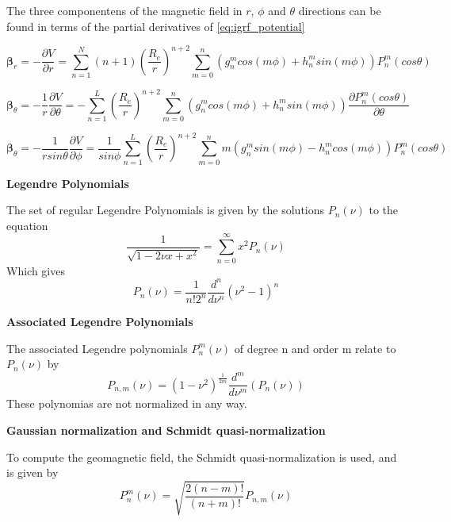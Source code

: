 The three componentens of the magnetic field in $r$, $\phi$ and $\theta$ directions can be found in terms of the partial derivatives of \ref{eq:igrf_potential}

\begin{equation}
{\bm \beta}_r = -\dfrac{\partial V}{\partial r} = \sum_{n=1}^{N} (n+1) \left(\dfrac{R_e}{r}\right)^{n+2} \sum_{m=0}^{n} \left(g_n^m cos(m\phi) + h_n^m sin(m\phi)\right) P_n^m(cos\theta)
\end{equation}

\begin{equation}
{\bm \beta}_{\theta} = -\dfrac{1}{r} \dfrac{\partial V}{\partial \theta} = 
-\sum_{n=1}^{L} \left(\dfrac{R_e}{r}\right)^{n+2} \sum_{m=0}^{n} \left(g_n^m cos(m\phi) + h_n^m sin(m\phi)\right) \dfrac{\partial P_n^m(cos\theta)}{\partial \theta}
\end{equation}

\begin{equation}
{\bm \beta}_{\theta} = -\dfrac{1}{r sin\theta} \dfrac{\partial V}{\partial \phi} = 
\dfrac{1}{sin\phi}\sum_{n=1}^{L} \left(\dfrac{R_e}{r}\right)^{n+2} \sum_{m=0}^{n} m\left(g_n^m sin(m\phi) - h_n^m cos(m\phi)\right) P_n^m(cos\theta)
\end{equation}

{\bf Legendre Polynomials}

The set of regular Legendre Polynomials is given by the solutions $P_n(\nu)$ to the equation
\begin{equation}
\dfrac{1}{\sqrt{1-2\nu x + x^2}} = \sum_{n=0}^\infty x^2 P_n(\nu)
\end{equation}
Which gives
\begin{equation}
P_n(\nu) = \dfrac{1}{n! 2^n} \dfrac{d^n}{d\nu^n} (\nu^2 -1)^n
\end{equation}

{\bf Associated Legendre Polynomials}

The associated Legendre polynomials $P_n^m(\nu)$ of degree n and order m relate to $P_n(\nu)$ by
\begin{equation}
P_{n,m}(\nu) = (1-\nu^2)^{\frac{1}{2m}} \dfrac{d^m}{d\nu^m}(P_n(\nu))
\end{equation}
These polynomias are not normalized in any way. 

{\bf Gaussian normalization and Schmidt quasi-normalization}

To compute the geomagnetic field, the Schmidt quasi-normalization is used, and is given by
\begin{equation}
P_n^m(\nu) = \sqrt{\dfrac{2(n-m)!}{(n+m)!}} P_{n,m}(\nu) 
\end{equation}

